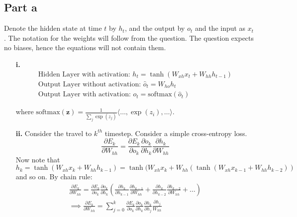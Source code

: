 \documentclass{article}
\newcommand{\Do}{\partial}
\begin{document}
\subsection*{Part a}
\begin{flushleft}
Denote the hidden state at time \(t\) by \(h_{t}\), and the output by \(o_{t}\) and the input as \(x_{t}\). The notation for the weights will follow from the question. The question expects no biases, hence the equations will not contain them.
\begin{itemize}
\item [\textbf{i.}]
\begin{gather}
\text{Hidden Layer with activation: }h_{t} = \tanh(W_{xh}x_{t} + W_{hh}h_{t-1}) \\
\text{Output Layer without activation: }\hat{o}_{t} = W_{ho}h_{t} \\
\text{Output Layer with activation: }o_{t} = \mathrm{softmax}(\hat{o}_{t})
\end{gather}

where \(\mathrm{softmax}(\mathbf{z}) = \frac{1}{\displaystyle \sum_{j} \exp(z_{j})}\langle \ldots, \exp(z_{i}), \ldots \rangle\).

\item [\textbf{ii.}]
Consider the travel to \(k^{th}\) timestep. Consider a simple cross-entropy loss.
\begin{equation} 
\frac{\Do E_{k}}{\Do W_{hh}} = \frac{\Do E_{k}}{\Do o_{k}} \frac{\Do o_{k}}{\Do h_{k}} \frac{\Do h_{k}}{\Do W_{hh}}
\end{equation}
Now note that \(h_{k} = \tanh(W_{xh}x_{k} + W_{hh}h_{k-1}) = \tanh(W_{xh}x_{k} + W_{hh}(\tanh(W_{xh}x_{k-1} + W_{hh}h_{k-2}))\) and so on. By chain rule:
\begin{gather}
\frac{\Do E_{k}}{\Do W_{hh}} = \frac{\Do E_{k}}{\Do o_{k}} \frac{\Do o_{k}}{\Do h_{k}} \left(\frac{\Do h_{k}}{\Do h_{k-1}} \frac{\Do h_{k-1}}{\Do W_{hh}} + \frac{\Do h_{k}}{\Do h_{k-2}} \frac{\Do h_{k-2}}{\Do W_{hh}} + \ldots \right) \\
\implies \frac{\Do E_{k}}{\Do W_{hh}} = \displaystyle \sum_{j=0}^{k} \frac{\Do E_{k}}{\Do o_{k}} \frac{\Do o_{k}}{\Do h_{k}} \frac{\Do h_{k}}{\Do h_{j}} \frac{\Do h_{j}}{W_{hh}}
\end{gather}
\end{itemize}
\end{flushleft}
\end{document}
